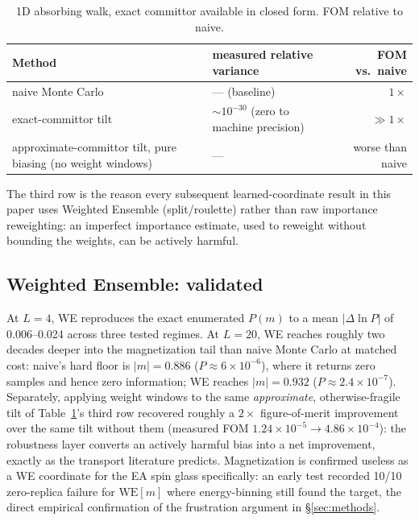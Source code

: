 \documentclass[11pt]{article}
\begin{document}
	\begin{table}[h]
		\centering\small
		\caption{1D absorbing walk, exact committor available in closed form. FOM relative to naive.}
		\label{tab:demo}
		\begin{tabular}{p{5.4cm}p{4.4cm}r}
			\toprule
			Method & measured relative variance & FOM vs.\ naive \\
			\midrule
			naive Monte Carlo & --- (baseline) & $1\times$ \\
			exact-committor tilt & $\sim10^{-30}$ (zero to machine precision) & $\gg1\times$ \\
			approximate-committor tilt, pure biasing (no weight windows) & --- & worse than naive \\
			\bottomrule
		\end{tabular}
	\end{table}
	
	The third row is the reason every subsequent learned-coordinate result in this paper uses
	Weighted Ensemble (split/roulette) rather than raw importance reweighting: an imperfect
	importance estimate, used to reweight without bounding the weights, can be actively harmful.
	
	\subsection{Weighted Ensemble: validated}
	\label{sec:res-we}
	At $L=4$, WE reproduces the exact enumerated $P(m)$ to a mean $|\Delta\ln P|$ of
	0.006--0.024 across three tested regimes. At $L=20$, WE reaches roughly two decades deeper
	into the magnetization tail than naive Monte Carlo at matched cost: naive's hard floor is
	$|m|=0.886$ ($P\approx6\times10^{-6}$), where it returns zero samples and hence zero
	information; WE reaches $|m|=0.932$ ($P\approx2.4\times10^{-7}$). Separately, applying
	weight windows to the same \emph{approximate}, otherwise-fragile tilt of
	Table~\ref{tab:demo}'s third row recovered roughly a $2\times$ figure-of-merit improvement
	over the same tilt without them (measured FOM $1.24\times10^{-5}\to4.86\times10^{-4}$):
	the robustness layer converts an actively harmful bias into a net improvement, exactly as
	the transport literature predicts. Magnetization is confirmed useless as a WE coordinate
	for the EA spin glass specifically: an early test recorded 10/10 zero-replica failure for
	$\mathrm{WE}[m]$ where energy-binning still found the target, the direct empirical
	confirmation of the frustration argument in \S\ref{sec:methods}.
	
\end{document}

